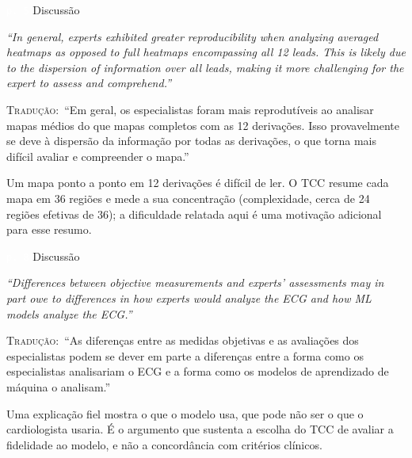 \documentclass[11pt,a4paper]{article}
\newcommand{\pagechip}[1]{{\setlength{\fboxsep}{1.5pt}\colorbox{cAcc}{\textcolor{white}{\scriptsize\texttt{#1}}}}}
\newenvironment{origquote}{\par\itshape\small}{\par}
\newenvironment{tradquote}{\par\small\textsc{Tradução:}\ }{\par}
\newcommand{\explab}[1]{\par\smallskip{\small\color{cAcc}\textbf{\MakeUppercase{#1}}}\par}
\begin{document}
\begin{citacard}{\pagechip{p. 5} Discussão}
\begin{origquote}“In general, experts exhibited greater reproducibility when analyzing averaged heatmaps as opposed to full heatmaps encompassing all 12 leads. This is likely due to the dispersion of information over all leads, making it more challenging for the expert to assess and comprehend.”\end{origquote}
\begin{tradquote}“Em geral, os especialistas foram mais reprodutíveis ao analisar mapas médios do que mapas completos com as 12 derivações. Isso provavelmente se deve à dispersão da informação por todas as derivações, o que torna mais difícil avaliar e compreender o mapa.”\end{tradquote}
\explab{Explicação}
Um mapa ponto a ponto em 12 derivações é difícil de ler. O TCC resume cada mapa em 36 regiões e mede a sua concentração (complexidade, cerca de 24 regiões efetivas de 36); a dificuldade relatada aqui é uma motivação adicional para esse resumo.
\end{citacard}

\begin{citacard}{\pagechip{p. 8} Discussão}
\begin{origquote}“Differences between objective measurements and experts’ assessments may in part owe to differences in how experts would analyze the ECG and how ML models analyze the ECG.”\end{origquote}
\begin{tradquote}“As diferenças entre as medidas objetivas e as avaliações dos especialistas podem se dever em parte a diferenças entre a forma como os especialistas analisariam o ECG e a forma como os modelos de aprendizado de máquina o analisam.”\end{tradquote}
\explab{Explicação}
Uma explicação fiel mostra o que o modelo usa, que pode não ser o que o cardiologista usaria. É o argumento que sustenta a escolha do TCC de avaliar a fidelidade ao modelo, e não a concordância com critérios clínicos.
\end{citacard}
\end{document}
